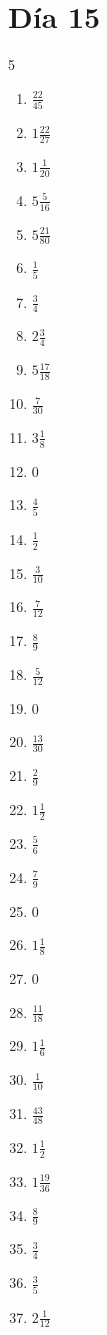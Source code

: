 \documentclass[12pt]{article}
\begin{document}
\section*{Día 15}
\begin{multicols}{5}\begin{enumerate}
\item $ \frac{22}{45} $
\item $ 1 \frac{22}{27} $
\item $ 1 \frac{1}{20} $
\item $ 5 \frac{5}{16} $
\item $ 5 \frac{21}{80} $
\item $ \frac{1}{5} $
\item $ \frac{3}{4} $
\item $ 2 \frac{3}{4} $
\item $ 5 \frac{17}{18} $
\item $ \frac{7}{30} $
\item $ 3 \frac{1}{8} $
\item $ 0 $
\item $ \frac{4}{5} $
\item $ \frac{1}{2} $
\item $ \frac{3}{10} $
\item $ \frac{7}{12} $
\item $ \frac{8}{9} $
\item $ \frac{5}{12} $
\item $ 0 $
\item $ \frac{13}{30} $
\item $ \frac{2}{9} $
\item $ 1 \frac{1}{2} $
\item $ \frac{5}{6} $
\item $ \frac{7}{9} $
\item $ 0 $
\item $ 1 \frac{1}{8} $
\item $ 0 $
\item $ \frac{11}{18} $
\item $ 1 \frac{1}{6} $
\item $ \frac{1}{10} $
\item $ \frac{43}{48} $
\item $ 1 \frac{1}{2} $
\item $ 1 \frac{19}{36} $
\item $ \frac{8}{9} $
\item $ \frac{3}{4} $
\item $ \frac{3}{5} $
\item $ 2 \frac{1}{12} $

\end{enumerate}
\end{multicols}
\end{document}
